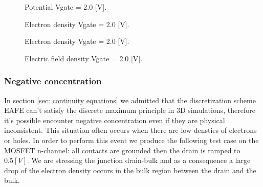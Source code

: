 \clearpage

\begin{figure}[!h]
\centering
{}
\hspace{0.8cm}
\caption{Potential Vgate = 2.0 [V].}
\label{fig: potential mos}
\end{figure}

\vspace{0.5cm}

\begin{figure}[!h]
\centering
{}
\hspace{0.8cm}
\caption{Electron density Vgate = 2.0 [V].}
\label{fig: ndensity mos}
\end{figure}

\vspace{0.5cm}

\begin{figure}[!h]
\centering
{}
\hspace{0.8cm}
\caption{Electron density Vgate = 2.0 [V].}
\label{fig: pdensity mos}
\end{figure}


\begin{figure}[!t]
\centering
{}
\hspace{1cm}
\caption{Electric field density Vgate = 2.0 [V].}
\label{fig: electric field mos}
\end{figure}

\subsubsection{Negative concentration}

In section \ref{sec: continuity equations} we admitted that the discretization scheme EAFE can't satisfy the discrete maximum principle in 3D simulations, therefore it's possible encounter negative concentration even if they are physical inconsistent. This situation often occurs when there are low densties of electrons or holes. In order to perform this event we produce the following test case on the MOSFET n-channel: all contacts are grounded then the drain is ramped to $0.5 [V]$. We are stressing the junction drain-bulk and as a consequence a large drop of the electron density occurs in the bulk region between the drain and the bulk. 

